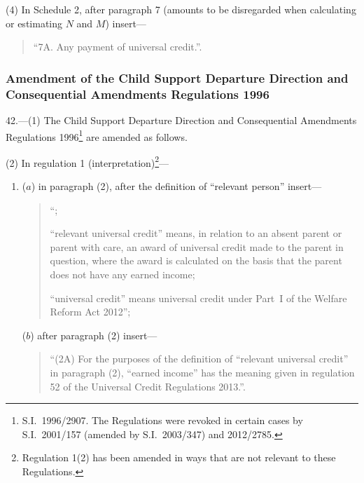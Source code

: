 \documentclass[12pt,a4paper]{article}
\begin{document}
(4) In Schedule 2, after paragraph 7 (amounts to be disregarded when calculating or estimating $N$ and $M$) insert—
\begin{quotation}
“7A.  Any payment of universal credit.”.
\end{quotation}

\subsubsection[42. Amendment of the Child Support Departure Direction and Consequential Amendments Regulations 1996]{Amendment of the Child Support Departure Direction and Consequential Amendments Regulations 1996}

42.—(1) The Child Support Departure Direction and Consequential Amendments Regulations 1996\footnote{S.I.~1996/2907. The Regulations were revoked in certain cases by S.I.~2001/157 (amended by S.I.~2003/347) and 2012/2785.} are amended as follows.

(2) In regulation 1 (interpretation)\footnote{Regulation 1(2) has been amended in ways that are not relevant to these Regulations.}—
\begin{enumerate}\item[]
($a$) in paragraph (2), after the definition of “relevant person” insert—
\begin{quotation}
“;

“relevant universal credit” means, in relation to an absent parent or parent with care, an award of universal credit made to the parent in question, where the award is calculated on the basis that the parent does not have any earned income;

“universal credit” means universal credit under Part~I of the Welfare Reform Act 2012”;
\end{quotation}

($b$) after paragraph (2) insert—
\begin{quotation}
“(2A) For the purposes of the definition of “relevant universal credit” in paragraph (2), “earned income” has the meaning given in regulation 52 of the Universal Credit Regulations 2013.”.
\end{quotation}
\end{enumerate}
\end{document}
